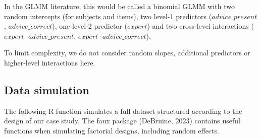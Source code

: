 \documentclass[
  man,floatsintext]{apa6}
\begin{document}
In the GLMM literature, this would be called a binomial GLMM with two random intercepts (for subjects and items), two level-1 predictors (\(advice\_present\), \(advice\_correct\)), one level-2 predictor (\(expert\)) and two cross-level interactions (\(expert \cdot advice\_present\), \(expert \cdot advice\_correct\)).

To limit complexity, we do not consider random slopes, additional predictors or higher-level interactions here.

\hypertarget{data-simulation}{%
\subsection{Data simulation}\label{data-simulation}}

The following R function simulates a full dataset structured according to the design of our case study. The faux package (DeBruine, 2023) contains useful functions when simulating factorial designs, including random effects.
\end{document}
